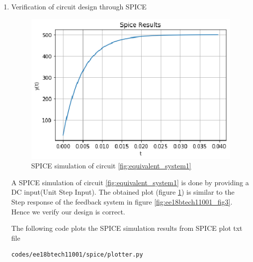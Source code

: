 \begin{enumerate}[label=\thesection.\arabic*.,ref=\thesection.\theenumi]
\begin{table}[!ht]
\centering

\caption{Circuit Parameters}
\label{table:ee18btech11001_params2}
\end{table}

\item Verification of circuit design through SPICE

\begin{figure}[!ht]
\centering
    \includegraphics[width=\columnwidth]{./figs/ee18btech11001/Figure_4.eps}
  \caption{SPICE simulation of circuit \ref{fig:equivalent_system1}}
  \label{fig:ee18btech11001_fig5}
\end{figure}

A SPICE simulation of circuit \ref{fig:equivalent_system1} is done by providing a DC input(Unit Step Input). The obtained plot (figure \ref{fig:ee18btech11001_fig5}) is similar to the Step response of the feedback system in figure \ref{fig:ee18btech11001_fig3}. Hence we verify our design is correct.



The following code plots the SPICE simulation results
from SPICE plot txt file

\begin{lstlisting}
codes/ee18btech11001/spice/plotter.py
\end{lstlisting}
\end{enumerate}